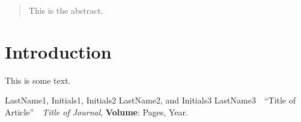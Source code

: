 \documentclass[twocolumn]{article}
\begin{document}
\thispagestyle{fancy}

\begin{abstract}

This is the abstract.

\end{abstract}

\section{Introduction}

This is some text.



\begin{thebibliography}{}

LastName1, Initials1, Initials2 LastName2, and Initials3 LastName3\ \
``Title of Article''\ \ {\it Title of Journal}, {\bf Volume}: Pages, Year.

\end{thebibliography}

\newpage


\end{document}

